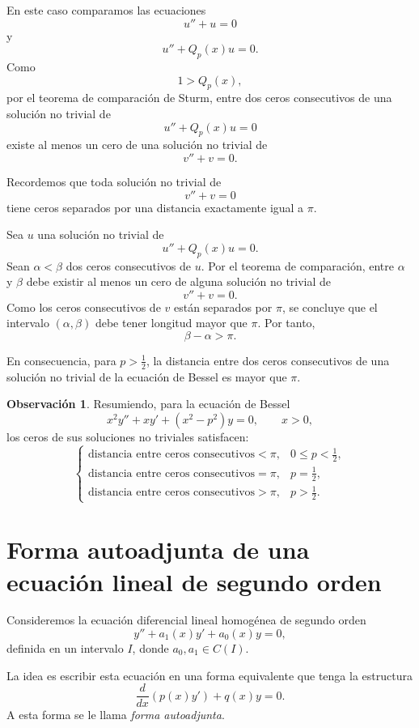 \documentclass[12pt,a4paper]{article}
\theoremstyle{definition}
\newtheorem{observacion}[teorema]{Observación}
\begin{document}
En este caso comparamos las ecuaciones
\[
u''+u=0
\]
y
\[
u''+Q_p(x)u=0.
\]
Como
\[
1>Q_p(x),
\]
por el teorema de comparación de Sturm, entre dos ceros consecutivos de una solución no trivial de
\[
u''+Q_p(x)u=0
\]
existe al menos un cero de una solución no trivial de
\[
v''+v=0.
\]

Recordemos que toda solución no trivial de
\[
v''+v=0
\]
tiene ceros separados por una distancia exactamente igual a \(\pi\).

Sea \(u\) una solución no trivial de
\[
u''+Q_p(x)u=0.
\]
Sean \(\alpha<\beta\) dos ceros consecutivos de \(u\). Por el teorema de comparación, entre \(\alpha\) y \(\beta\) debe existir al menos un cero de alguna solución no trivial de
\[
v''+v=0.
\]
Como los ceros consecutivos de \(v\) están separados por \(\pi\), se concluye que el intervalo \((\alpha,\beta)\) debe tener longitud mayor que \(\pi\). Por tanto,
\[
\beta-\alpha>\pi.
\]

En consecuencia, para \(p>\frac12\), la distancia entre dos ceros consecutivos de una solución no trivial de la ecuación de Bessel es mayor que \(\pi\).

\begin{observacion}
Resumiendo, para la ecuación de Bessel
\[
x^2y''+xy'+(x^2-p^2)y=0,
\qquad x>0,
\]
los ceros de sus soluciones no triviales satisfacen:
\[
\begin{cases}
\text{distancia entre ceros consecutivos}<\pi, & 0\leq p<\frac12,\\[4pt]
\text{distancia entre ceros consecutivos}=\pi, & p=\frac12,\\[4pt]
\text{distancia entre ceros consecutivos}>\pi, & p>\frac12.
\end{cases}
\]
\end{observacion}

\section{Forma autoadjunta de una ecuación lineal de segundo orden}

Consideremos la ecuación diferencial lineal homogénea de segundo orden
\begin{equation}\label{eq:lineal-general}
y''+a_1(x)y'+a_0(x)y=0,
\end{equation}
definida en un intervalo \(I\), donde \(a_0,a_1\in C(I)\).

La idea es escribir esta ecuación en una forma equivalente que tenga la estructura
\[
\frac{d}{dx}\left(p(x)y'\right)+q(x)y=0.
\]
A esta forma se le llama \emph{forma autoadjunta}.
\end{document}

